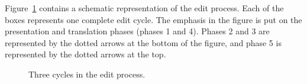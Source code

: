 \par  Figure~\ref{simpleeditprocess} contains a schematic
      representation of the edit process. Each of the boxes represents one complete
      edit cycle. The emphasis in the figure is put on the presentation and
      translation phases (phases 1 and 4). Phases 2 and 3 are represented by the
      dotted arrows at the bottom of the figure, and phase 5 is represented by the
      dotted arrows at the top.
\begin{figure}
\begin{small}
\begin{center}
\begin{center}
\begin{scriptsize}
\bigskip \noindent
\end{scriptsize}
\end{center}\caption{Three cycles in the edit process.}\label{simpleeditprocess} 
\end{center}
\end{small}
\end{figure}

